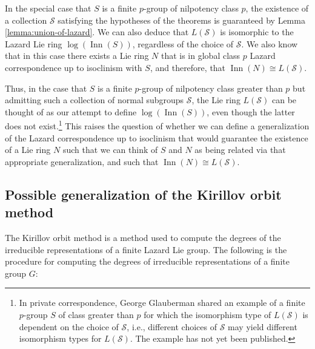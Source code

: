 In the special case that $S$ is a finite $p$-group of nilpotency class
$p$, the existence of a collection $\mathcal{S}$ satisfying the
hypotheses of the theorems is guaranteed by Lemma
\ref{lemma:union-of-lazard}. We can also deduce that $L(\mathcal{S})$
is isomorphic to the Lazard Lie ring $\log(\operatorname{Inn}(S))$,
regardless of the choice of $\mathcal{S}$. We also know that in this
case there exists a Lie ring $N$ that is in global class $p$ Lazard
correspondence up to isoclinism with $S$, and therefore, that
$\operatorname{Inn}(N) \cong L(\mathcal{S})$.

Thus, in the case that $S$ is a finite $p$-group of nilpotency class
greater than $p$ but admitting such a collection of normal subgroups
$\mathcal{S}$, the Lie ring $L(\mathcal{S})$ can be thought of as our
attempt to define $\log(\operatorname{Inn}(S))$, even though the
latter does not exist.\footnote{In private correspondence, George
  Glauberman shared an example of a finite $p$-group $S$ of class
  greater than $p$ for which the isomorphism type of $L(\mathcal{S})$
  is dependent on the choice of $\mathcal{S}$, i.e., different choices
  of $\mathcal{S}$ may yield different isomorphism types for
  $L(\mathcal{S})$. The example has not yet been published.} This
raises the question of whether we can define a generalization of the
Lazard correspondence up to isoclinism that would guarantee the
existence of a Lie ring $N$ such that we can think of $S$ and $N$ as
being related via that appropriate generalization, and such that
$\operatorname{Inn}(N) \cong L(\mathcal{S})$.

\subsection{Possible generalization of the Kirillov orbit method}\label{sec:kirillov-orbit-method}

The Kirillov orbit method is a method used to compute the degrees of
the irreducible representations of a finite Lazard Lie group. The
following is the procedure for computing the degrees of irreducible
representations of a finite group $G$:

